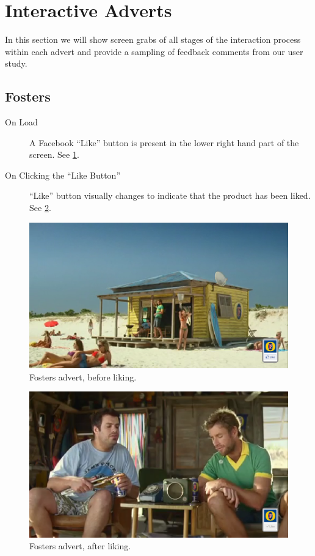 \section{Interactive Adverts}
In this section we will show screen grabs of all stages of the interaction process within each advert and provide a sampling of feedback comments from our user study.

\subsection{Fosters}
	\begin{description}
		\item[On Load]{A Facebook ``Like'' button is present in the lower right hand part of the screen. See \ref{fig:fosters1}.}
		\item[On Clicking the ``Like Button'']{``Like'' button visually changes to indicate that the product has been liked. See \ref{fig:fosters2}.}
	\end{description}
	
	\begin{figure}[th]
		\centering
		\includegraphics[width=\textwidth,height=0.5\textheight,keepaspectratio]{images/adverts/fosters-1.png}
		\caption{Fosters advert, before liking.}
		\label{fig:fosters1}
	\end{figure}
	
	\begin{figure}[th]
		\centering
		\includegraphics[width=\textwidth,height=0.5\textheight,keepaspectratio]{images/adverts/fosters-2.png}
		\caption{Fosters advert, after liking.}
		\label{fig:fosters2}
	\end{figure}
	
